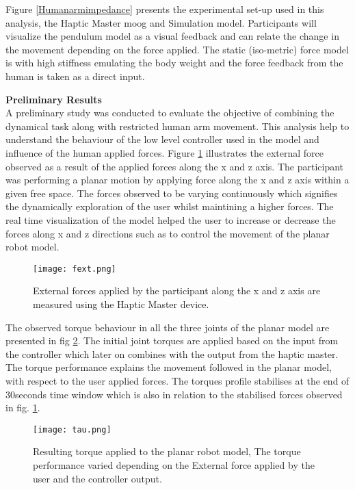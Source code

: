 Figure {\ref{Humanarmimpedance}} presents the experimental set-up used in this analysis, the Haptic Master moog and Simulation model. Participants will visualize the pendulum model as a visual feedback and can relate the change in the movement depending on the force applied. The static (iso-metric) force model is with high stiffness emulating the body weight and the force feedback from the human is taken as a direct input. 

\textbf{Preliminary Results}\\
A preliminary study was conducted to evaluate the objective of combining the dynamical task along with restricted human arm movement. This analysis help to understand the behaviour of the low level controller used in the model and influence of the human applied forces. Figure {\ref{externalforce}} illustrates the external force observed as a result of the applied forces along the x and z axis. The participant was performing a planar motion by applying force along the x and z axis within a given free space. The forces observed to be varying continuously which signifies the dynamically exploration of the user whilst maintining a higher forces. The real time visualization of the model helped the user to increase or decrease the forces along x and z directions such as to control the movement of the planar robot model.
\begin{figure} 
\centering
\texttt{[image: fext.png]}
\caption{ External forces applied by the participant along the x and z axis are measured using the Haptic Master device.}
\label{externalforce}
\end{figure}

The observed torque behaviour in all the three joints of the planar model are presented in fig {\ref{torque}}. The initial joint torques are applied based on the input from the controller which later on combines with the output from the haptic master. The torque performance explains the movement followed in the planar model, with respect to the user applied forces. The torques profile stabilises at the end of 30seconds time window which is also in relation to the stabilised forces observed in fig. {\ref{externalforce}}.  
\begin{figure} 
\centering
\texttt{[image: tau.png]}
\caption{Resulting torque applied to the planar robot model, The torque performance varied depending on the External force applied by the user and the controller output.}
\label{torque}
\end{figure}


